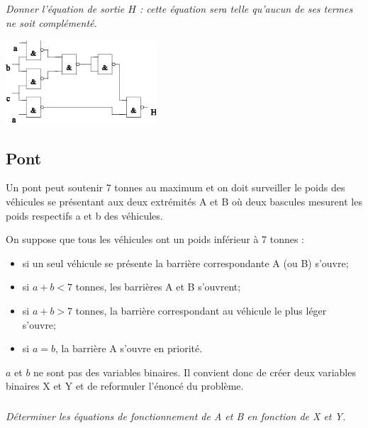 \documentclass[10pt]{article}
\begin{document}
\begin{minipage}[c]{.5\linewidth}
\subparagraph{}
\textit{Donner l’équation de sortie $H$ : cette équation sera telle qu’aucun de ses termes ne soit complémenté.}
\end{minipage}\hfill
\begin{minipage}[c]{.45\linewidth}
\begin{center}
\includegraphics[width=.9\textwidth]{images/logigramme}
\end{center}
\end{minipage}


\subsection*{Pont}
\setcounter{subparagraph}{0}

Un pont peut soutenir 7 tonnes au maximum et on doit surveiller le poids des véhicules se présentant aux deux extrémités A et B où deux bascules mesurent les poids respectifs a et b des véhicules.

On suppose que tous les véhicules ont un poids inférieur à 7 tonnes :
\begin{itemize}
\item si un seul véhicule se présente la barrière correspondante A (ou B) s’ouvre;
\item si $a+b < 7$ tonnes, les barrières A et B s’ouvrent;
\item si $a+b > 7$ tonnes, la barrière correspondant au véhicule le plus léger s’ouvre;
\item si $a=b$, la barrière A s’ouvre en priorité.
\end{itemize}

$a$ et $b$ ne sont pas des variables binaires. Il convient donc de créer deux variables binaires X et Y et de reformuler l’énoncé du problème. 

\subparagraph{}
\textit{Déterminer les équations de fonctionnement de A et B en fonction de X et Y.}
\end{document}
